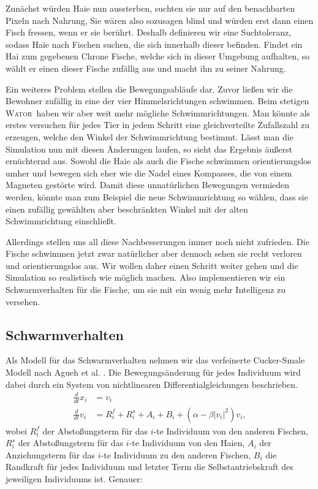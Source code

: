 \documentclass[a4paper,11pt]{article}
\newcommand{\wator}{\textsc{Wator}}
\theoremstyle{definition}
\numberwithin{equation}{section}
\begin{document}
	Zunächst würden Haie nun aussterben, suchten sie nur auf den benachbarten Pixeln nach Nahrung, Sie wären also sozusagen blind und würden erst dann einen Fisch fressen, wenn er sie berührt. Deshalb definieren wir eine Suchtoleranz, sodass Haie nach Fischen suchen, die sich innerhalb dieser befinden. Findet ein Hai zum gegebenen Chrone Fische, welche sich in dieser Umgebung aufhalten, so wählt er einen dieser Fische zufällig aus und macht ihn zu seiner Nahrung.\newline
	
	Ein weiteres Problem stellen die Bewegungsabläufe dar. Zuvor ließen wir die Bewohner zufällig in eine der vier Himmelsrichtungen schwimmen. Beim stetigen \wator\ haben wir aber weit mehr mögliche Schwimmrichtungen. Man könnte als erstes versuchen für jedes Tier in jedem Schritt eine gleichverteilte Zufallszahl zu erzeugen, welche den Winkel der Schwimmrichtung bestimmt.
	Lässt man die Simulation nun mit diesen Änderungen laufen, so sieht das Ergebnis äußerst ernüchternd aus.
	Sowohl die Haie als auch die Fische schwimmen orientierungslos umher und bewegen sich eher wie die Nadel eines Kompasses, die von einem Magneten gestörte wird. 
	Damit diese unnatürlichen Bewegungen vermieden werden, könnte man zum Beispiel die neue Schwimmrichtung so wählen, dass sie einen zufällig gewählten aber beschränkten Winkel mit der alten Schwimmrichtung einschließt.\newline
	
	Allerdings stellen uns all diese Nachbesserungen immer noch nicht zufrieden. Die Fische schwimmen jetzt zwar natürlicher aber dennoch sehen sie recht verloren und orientierungslos aus. Wir wollen daher einen Schritt weiter gehen und die Simulation so realistisch wie möglich machen. Also implementieren wir ein Schwarmverhalten für die Fische, um sie mit ein wenig mehr Intelligenz zu versehen.
	
	\subsection{Schwarmverhalten}
	Als Modell für das Schwarmverhalten nehmen wir das verfeinerte Cucker-Smale Modell nach Agueh et al. \cite{agueh2011analysis}. 
	Die Bewegungsänderung für jedes Individuum wird dabei durch ein System von nichtlinearen Differentialgleichungen beschrieben.
	\begin{align*}
		\frac{d}{dt}x_i &= v_i\\
		\frac{d}{dt}v_i &= R^f_i + R^s_i + A_i  + B_i + (\alpha - \beta |v_i|^2)v_i,
	\end{align*}
	wobei $R^f_i$ der Abstoßungsterm für das $i$-te Individuum von den anderen Fischen, $R^s_i$ der Abstoßungsterm für das $i$-te Individuum von den Haien, $A_i$ der Anziehungsterm für das $i$-te Individuum zu den anderen Fischen, $B_i$ die Randkraft für jedes Individuum und letzter Term die Selbstantriebskraft des jeweiligen Individuums ist.\newline
	Genauer:
\end{document}
